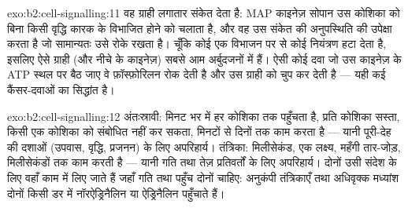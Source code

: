 \begin{solution}{exo:b2:cell-signalling:11}
वह ग्राही लगातार संकेत देता है: MAP काइनेज़ सोपान उस
कोशिका को बिना किसी वृद्धि कारक के विभाजित होने को चलाता है, और वह उस
संकेत की अनुपस्थिति की उपेक्षा करता है जो सामान्यतः उसे रोके रखता है। चूँकि कोई एक
 विभाजन पर से कोई नियंत्रण हटा देता है, इसलिए ऐसे ग्राही (और नीचे के
काइनेज़) सबसे आम अर्बुदजनों में हैं। ऐसी कोई दवा जो
उस काइनेज़ के ATP स्थल पर बैठ जाए वे फ़ॉस्फ़ोरिलन रोक देती है और
उस ग्राही को चुप कर देती है --- यही कई कैंसर-दवाओं का सिद्धांत है।
\end{solution}

\begin{solution}{exo:b2:cell-signalling:12}
अंतःस्रावी: मिनट भर में हर कोशिका तक पहुँचता है, प्रति कोशिका सस्ता, किसी एक
कोशिका को संबोधित नहीं कर सकता, मिनटों से दिनों तक काम करता है --- यानी
पूरी-देह की दशाओं (उपवास, वृद्धि, प्रजनन) के लिए अपरिहार्य। तंत्रिका:
मिलीसेकंड, एक लक्ष्य, महँगी तार-जोड़, मिलीसेकंडों तक काम करती है
--- यानी गति तथा तेज़ प्रतिवर्तों के लिए अपरिहार्य। दोनों उसी संदेश के लिए
वहाँ काम में लिए जाते हैं जहाँ गति तथा पहुँच दोनों चाहिए: अनुकंपी
तंत्रिकाएँ तथा अधिवृक्क मध्यांश दोनों किसी डर में
नॉरऐड्रिनैलिन या ऐड्रिनैलिन पहुँचाते हैं।
\end{solution}

